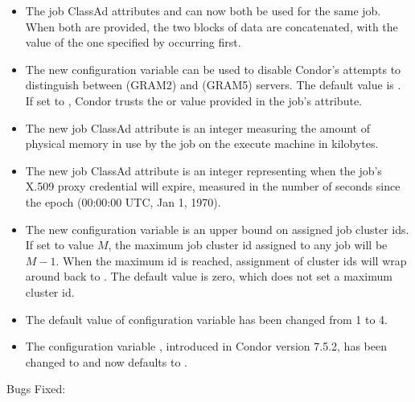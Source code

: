 \begin{itemize}
\item The job ClassAd attributes  and
 can now both be used for the same
job. When both are provided, the two blocks of data are concatenated,
with the value of the one specified by 
occurring first.

\item The new configuration variable 
can be used to disable Condor's attempts to distinguish between 
(GRAM2) and  (GRAM5) servers.
The default value is .
If set to , Condor trusts the  or  value
provided in the job's  attribute.

\item The new job ClassAd attribute  is an integer
measuring the amount of physical memory in use by the job on the execute
machine in kilobytes.

\item The new job ClassAd attribute  is an
integer representing when the job's X.509 proxy credential will expire,
measured in the
number of seconds since the epoch (00:00:00 UTC, Jan 1, 1970).

\item The new configuration variable 
is an upper bound on assigned job cluster ids. If set to
value $M$, the maximum job cluster id assigned to any job will be $M-1$.
When the maximum id is reached, assignment of cluster ids will wrap around 
back to . The default value is zero,
which does not set a maximum cluster id. 

\item The default value of configuration variable 
 has been changed from 1 to 4.

\item The configuration variable , introduced in
  Condor version 7.5.2, has been changed to
   and now defaults to .

\end{itemize}

\noindent Bugs Fixed:

